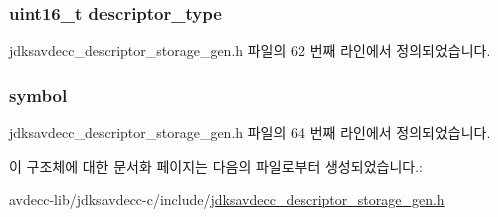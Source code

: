 \subsubsection[{\texorpdfstring{descriptor\+\_\+type}{descriptor_type}}]{\setlength{\rightskip}{0pt plus 5cm}uint16\+\_\+t descriptor\+\_\+type}\hypertarget{structjdksavdecc__descriptor__storage__gen__symbol_ab7c32b6c7131c13d4ea3b7ee2f09b78d}{}\label{structjdksavdecc__descriptor__storage__gen__symbol_ab7c32b6c7131c13d4ea3b7ee2f09b78d}


jdksavdecc\+\_\+descriptor\+\_\+storage\+\_\+gen.\+h 파일의 62 번째 라인에서 정의되었습니다.

\subsubsection[{\texorpdfstring{symbol}{symbol}}]{ symbol}\hypertarget{structjdksavdecc__descriptor__storage__gen__symbol_a0a81ee27053a63e71a6c7db060562eb0}{}\label{structjdksavdecc__descriptor__storage__gen__symbol_a0a81ee27053a63e71a6c7db060562eb0}


jdksavdecc\+\_\+descriptor\+\_\+storage\+\_\+gen.\+h 파일의 64 번째 라인에서 정의되었습니다.



이 구조체에 대한 문서화 페이지는 다음의 파일로부터 생성되었습니다.\+:\begin{DoxyCompactItemize}
\item 
avdecc-\/lib/jdksavdecc-\/c/include/\hyperlink{jdksavdecc__descriptor__storage__gen_8h}{jdksavdecc\+\_\+descriptor\+\_\+storage\+\_\+gen.\+h}\end{DoxyCompactItemize}

